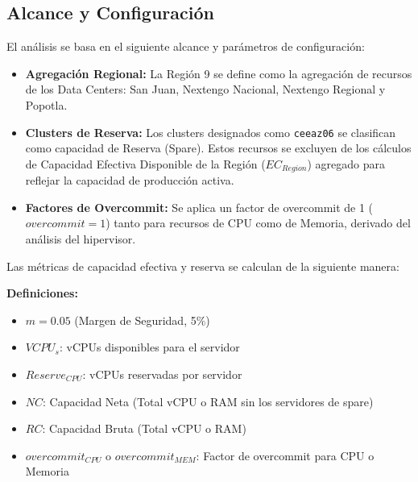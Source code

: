 \documentclass[11pt,a4paper]{article}
\begin{document}
\subsection{Alcance y Configuración}
El análisis se basa en el siguiente alcance y parámetros de configuración:
\begin{itemize}
    \item \textbf{Agregación Regional:} La Región 9 se define como la agregación de recursos de los Data Centers: San Juan, Nextengo Nacional, Nextengo Regional y Popotla.
    \item \textbf{Clusters de Reserva:} Los clusters designados como \texttt{ceeaz06} se clasifican como capacidad de Reserva (Spare). Estos recursos se excluyen de los cálculos de Capacidad Efectiva Disponible de la Región ($EC_{Region}$) agregado para reflejar la capacidad de producción activa.
    \item \textbf{Factores de Overcommit:} Se aplica un factor de overcommit de 1 ($overcommit = 1$) tanto para recursos de CPU como de Memoria, derivado del análisis del hipervisor.
\end{itemize}

Las métricas de capacidad efectiva y reserva se calculan de la siguiente manera:

\textbf{Definiciones:}
\begin{itemize}
    \item $m = 0.05$ (Margen de Seguridad, 5\%)
    \item $VCPU_s$: vCPUs disponibles para el servidor
    \item $Reserve_{CPU}$: vCPUs reservadas por servidor
    \item $NC$: Capacidad Neta (Total vCPU o RAM sin los servidores de spare)
    \item $RC$: Capacidad Bruta (Total vCPU o RAM)
    \item $overcommit_{CPU}$ o $overcommit_{MEM}$: Factor de overcommit para CPU o Memoria
\end{itemize}
\end{document}

